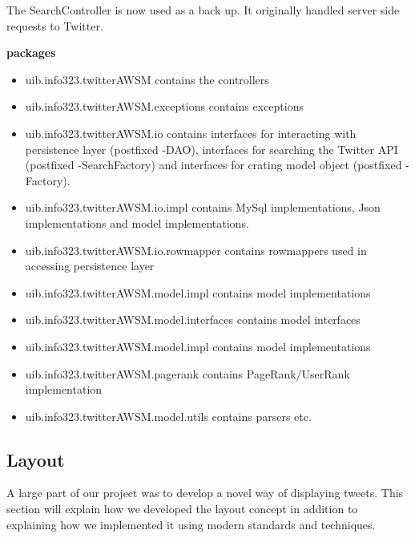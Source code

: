 The SearchController is now used as a back up. It originally handled server side requests to Twitter. %


{\bf packages}
\begin{itemize}
  \item uib.info323.twitterAWSM contains the controllers
  \item uib.info323.twitterAWSM.exceptions contains exceptions
  \item uib.info323.twitterAWSM.io contains interfaces for interacting with persistence layer (postfixed -DAO), interfaces for searching the Twitter API (postfixed -SearchFactory) and interfaces for crating model object (postfixed -Factory).
  \item uib.info323.twitterAWSM.io.impl contains MySql implementations, Json implementations and model implementations. 
  \item uib.info323.twitterAWSM.io.rowmapper contains rowmappers used in accessing persistence layer
  \item uib.info323.twitterAWSM.model.impl contains model implementations
  \item uib.info323.twitterAWSM.model.interfaces contains model interfaces
  \item uib.info323.twitterAWSM.model.impl contains model implementations
  \item uib.info323.twitterAWSM.pagerank contains PageRank/UserRank implementation
  \item uib.info323.twitterAWSM.model.utils contains parsers etc.
\end{itemize}


\subsection{Layout} %
A large part of our project was to develop a novel way of displaying tweets. This section will explain how we developed the layout concept in addition to explaining how we implemented it using modern standards and techniques.

